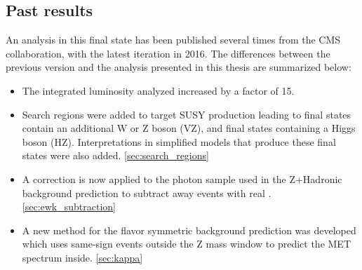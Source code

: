   \subsection{Past results}
  An analysis in this final state has been published several times from the CMS collaboration, with the latest iteration in 2016.\cite{paper_2012, paper_2015, paper_2016} The differences between the previous version and the analysis presented in this thesis are summarized below:
  \begin{itemize}
    \item The integrated luminosity analyzed increased by a factor of 15.
    \item Search regions were added to target SUSY production leading to final states contain an additional W or Z boson (VZ), and final states containing a Higgs boson (HZ). Interpretations in simplified models that produce these final states were also added. \ref{sec:search_regions}
    \item A correction is now applied to the photon sample used in the Z+Hadronic background prediction to subtract away events with real \MET. \ref{sec:ewk_subtraction}
    \item A new method for the flavor symmetric background prediction was developed which uses same-sign events outside the Z mass window to predict the MET spectrum inside. \ref{sec:kappa}
  \end{itemize}